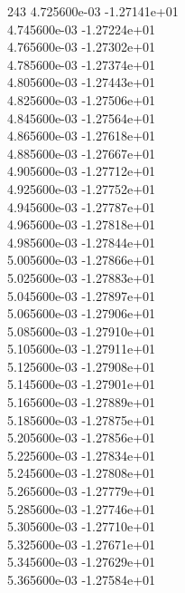 243	4.725600e-03	-1.27141e+01	\\ 	4.745600e-03	-1.27224e+01	\\ 	4.765600e-03	-1.27302e+01	\\ 	4.785600e-03	-1.27374e+01	\\ 	4.805600e-03	-1.27443e+01	\\ 	4.825600e-03	-1.27506e+01	\\ 	4.845600e-03	-1.27564e+01	\\ 	4.865600e-03	-1.27618e+01	\\ 	4.885600e-03	-1.27667e+01	\\ 	4.905600e-03	-1.27712e+01	\\ 	4.925600e-03	-1.27752e+01	\\ 	4.945600e-03	-1.27787e+01	\\ 	4.965600e-03	-1.27818e+01	\\ 	4.985600e-03	-1.27844e+01	\\ 	5.005600e-03	-1.27866e+01	\\ 	5.025600e-03	-1.27883e+01	\\ 	5.045600e-03	-1.27897e+01	\\ 	5.065600e-03	-1.27906e+01	\\ 	5.085600e-03	-1.27910e+01	\\ 	5.105600e-03	-1.27911e+01	\\ 	5.125600e-03	-1.27908e+01	\\ 	5.145600e-03	-1.27901e+01	\\ 	5.165600e-03	-1.27889e+01	\\ 	5.185600e-03	-1.27875e+01	\\ 	5.205600e-03	-1.27856e+01	\\ 	5.225600e-03	-1.27834e+01	\\ 	5.245600e-03	-1.27808e+01	\\ 	5.265600e-03	-1.27779e+01	\\ 	5.285600e-03	-1.27746e+01	\\ 	5.305600e-03	-1.27710e+01	\\ 	5.325600e-03	-1.27671e+01	\\ 	5.345600e-03	-1.27629e+01	\\ 	5.365600e-03	-1.27584e+01	\\ \hline
